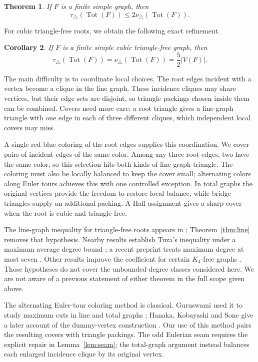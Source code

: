 \documentclass[11pt]{article}
\newtheorem{theorem}{Theorem}[section]
\newtheorem{corollary}[theorem]{Corollary}
\theoremstyle{remark}
\newcommand{\tri}{\triangle}
\newcommand{\Tot}{\operatorname{Tot}}
\begin{document}
\begin{theorem}\label{thm:total}
If $F$ is a finite simple graph, then
\[
  \tau_\tri(\Tot(F))\leq 2\nu_\tri(\Tot(F)).
\]
\end{theorem}

\begin{samepage}
For cubic triangle-free roots, we obtain the following exact refinement.

\begin{corollary}\label{cor:cubic}
If $F$ is a finite simple cubic triangle-free graph, then
\[
  \tau_\tri(\Tot(F))=\nu_\tri(\Tot(F))=\frac52|V(F)|.
\]
\end{corollary}
\end{samepage}

The main difficulty is to coordinate local choices.  The root edges incident
with a vertex become a clique in the line graph.  These incidence cliques
may share vertices, but their edge sets are disjoint, so triangle packings
chosen inside them can be combined.  Covers need more care: a root
triangle gives a line-graph triangle with one edge in each of three different
cliques, which independent local covers may miss.

A single red-blue coloring of the root edges supplies this coordination.
We cover pairs of incident edges of the same color.  Among any three root
edges, two have the same color, so this selection hits both kinds of
line-graph triangle.  The coloring must also be locally balanced to keep
the cover small; alternating colors along Euler tours achieves this with
one controlled exception.  In total graphs the original vertices provide
the freedom to restore local balance, while bridge triangles supply
an additional packing.  A Hall assignment gives a sharp cover when the
root is cubic and triangle-free.

The line-graph inequality for triangle-free roots appears in
\cite[Corollary~3.3.3]{munaro2016}; Theorem~\ref{thm:line} removes that
hypothesis.  Nearby results establish Tuza's inequality under a maximum
average degree bound \cite{puleo2015}; a recent preprint treats maximum
degree at most seven \cite{gupta2026}.  Other results improve the coefficient
for certain $K_4$-free graphs \cite{munaro2018}.  Those hypotheses do not cover
the unbounded-degree classes considered here.  We are not aware of a previous
statement of either theorem in the full scope given above.

The alternating Euler-tour coloring method is classical.  Guruswami used
it to study maximum cuts in line and total graphs \cite{guruswami1999};
Hanaka, Kobayashi and Sone give a later account of the dummy-vertex
construction \cite[Section~6]{hanaka2020}.  Our use of this method pairs
the resulting covers with triangle packings.  The odd Eulerian seam requires
the explicit repair in Lemma~\ref{lem:seam}; the total-graph argument instead
balances each enlarged incidence clique by its original vertex.
\end{document}
